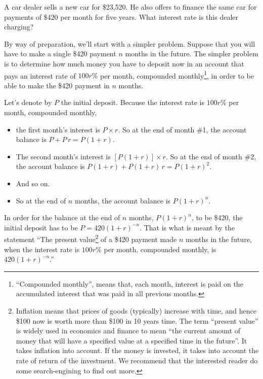 \begin{eg}\label{eg:NTMcar}
A car dealer sells a new car for \$23,520. He also offers to finance the same
car for payments of \$420 per month for five years. What interest rate
is this dealer charging?

\soln
By way of preparation, we'll start with a simpler problem.
Suppose that you will have to make a single \$420 payment $n$ months 
in the future. The simpler problem is to determine how much money you have 
to deposit now in an account that pays an interest rate of  $100 r\%$ per month, 
compounded monthly\footnote{``Compounded monthly'', means that, each month, interest is paid on the accumulated interest that was paid in all previous months.}, in order to be able to make the \$420 payment in $n$ months.

Let's denote by $P$ the initial deposit. Because the  interest rate is  
$100 r\%$ per month, compounded monthly,
\begin{itemize}\itemsep1pt \parskip0pt 
\item
the first month's interest is $P\times r$. 
So at the end of month \#1, the account balance is $P+P\,r=P(1+r)$.
\item
The second month's interest is $[P(1+r)]\times r$. So at the end of month \#2, 
the account balance is $P(1+r)+P(1+r)\,r=P(1+r)^2$.
\item
 And so on.
\item 
So at the end of $n$ months, the account balance is $P(1+r)^n$.
\end{itemize}
In order for the balance at the end of $n$ months, $P(1+r)^n$, to be \$420,
the initial deposit has to be $P=420(1+r)^{-n}$. That is what is meant by
the statement ``The present value\footnote{Inflation means that prices of goods (typically) increase with time, and hence \$100 now is worth more than \$100 
in 10 years time. The term ``present value'' is widely used in economics 
and finance to mean ``the current amount of money that will have a 
specified value at a specified time in the future''. It takes inflation
into account. If the money is invested, it takes into account the rate of 
return of the investment.  We recommend that the interested reader do 
some search-engining to find out more.} of a \$420 payment made $n$ months in the
future, when the interest rate is $100 r\%$ per month, compounded monthly,
is $420(1+r)^{-n}$.''


\end{eg}
